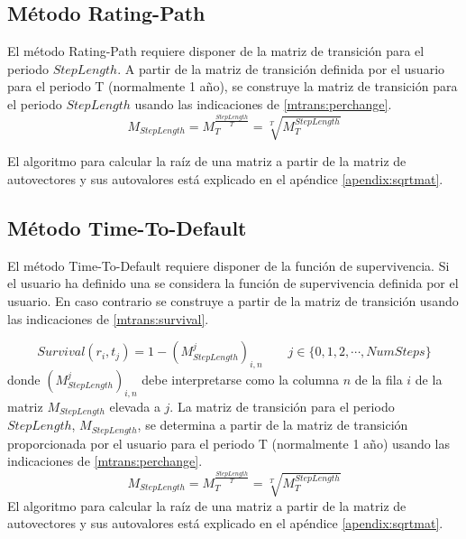 \subsection{M\'etodo Rating-Path}

El m\'etodo Rating-Path requiere disponer de la matriz de transici\'on
para el periodo $StepLength$. A partir de la matriz de transici\'on
definida por el usuario para el periodo T (normalmente 1 a\~no), se
construye la matriz de transici\'on para el periodo $StepLength$ usando
las indicaciones de \ref{mtrans:perchange}.
\begin{displaymath}
M_{StepLength} = M_{T}^{\frac{StepLength}{T}} = \sqrt[T]{M_{T}^{StepLength}}
\end{displaymath}

El algoritmo para calcular la ra\'iz de una matriz a partir de la matriz
de autovectores y sus autovalores est\'a explicado en el ap\'endice
\ref{apendix:sqrtmat}.

\subsection{M\'etodo Time-To-Default}

El m\'etodo Time-To-Default requiere disponer de la funci\'on de
supervivencia. Si el usuario ha definido una se considera la
funci\'on de supervivencia definida por el usuario. En caso
contrario se construye a partir de la matriz de transici\'on
usando las indicaciones de \ref{mtrans:survival}.

\begin{displaymath}
Survival(r_i,t_j) = 1 - (M_{StepLength}^j)_{i,n} \qquad j \in \{0,1,2,\cdots,NumSteps\}
\end{displaymath}
donde $(M_{StepLength}^j)_{i,n}$ debe interpretarse como la columna $n$ de
la fila $i$ de la matriz $M_{StepLength}$ elevada a $j$. La matriz de transici\'on
para el periodo $StepLength$, $M_{StepLength}$, se determina a partir de la matriz
de transici\'on proporcionada por el usuario para el periodo T (normalmente 1 a\~no)
usando las indicaciones de \ref{mtrans:perchange}.
\begin{displaymath}
M_{StepLength} = M_{T}^{\frac{StepLength}{T}} = \sqrt[T]{M_{T}^{StepLength}}
\end{displaymath}
El algoritmo para calcular la ra\'iz de una matriz a partir de la matriz
de autovectores y sus autovalores est\'a explicado en el ap\'endice
\ref{apendix:sqrtmat}.


